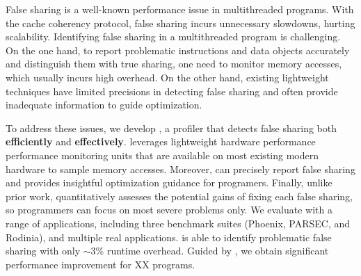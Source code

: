 False sharing is a well-known performance issue in multithreaded programs. With the cache coherency protocol, false sharing incurs unnecessary slowdowns, hurting scalability. Identifying false sharing in a multithreaded program is challenging. On the one hand, to report problematic instructions and data objects accurately and distinguish them with true sharing, one need to monitor memory accesses, which usually incurs high overhead. On the other hand, existing lightweight techniques have limited precisions in detecting false sharing and often provide inadequate information to guide optimization.

\sloppy
To address these issues, we develop \cheetah{}, a profiler that detects false sharing both {\bf efficiently} and {\bf effectively}. \cheetah{} leverages lightweight hardware performance performance monitoring units that are available on most existing modern hardware to sample memory accesses. Moreover, \cheetah{} can precisely report false sharing and provides insightful optimization guidance for programers. Finally,
unlike prior work, \cheetah{} quantitatively assesses the potential gains of fixing each false sharing, so programmers can focus on most severe problems only. %
We evaluate \cheetah{} with a range of applications, including three benchmark suites (Phoenix, PARSEC, and Rodinia), and multiple real applications. \Cheetah{} is able to identify problematic false sharing with only  $\sim$3\% runtime overhead. Guided by \Cheetah{}, we obtain significant performance improvement for XX programs.


